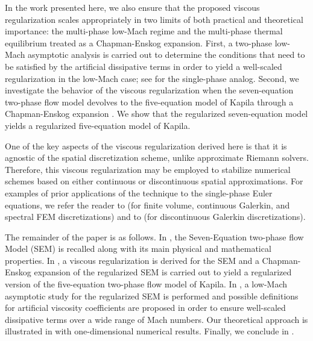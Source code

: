 In the work presented here, we also ensure that the proposed viscous regularization scales appropriately in two limits of both practical
and theoretical importance: the multi-phase low-Mach regime and the multi-phase thermal equilibrium treated as a Chapman-Enskog expansion.
First, a two-phase low-Mach asymptotic analysis is carried out to determine the conditions that need to be satisfied by the artificial dissipative 
terms in order to yield a well-scaled regularization in the low-Mach case; see \cite{Marco_paper_low_mach} for the single-phase analog. 
Second, we investigate the behavior of the viscous regularization when the seven-equation two-phase flow model devolves to the five-equation 
model of Kapila \cite{Kapila_2001} through a Chapman-Enskog expansion \cite{dellacherie,GuillardMurrone2003}. We show 
that the regularized seven-equation model yields a regularized five-equation model of Kapila.

One of the key aspects of the viscous regularization derived here is that it is agnostic of the spatial discretization scheme, unlike approximate 
Riemann solvers. Therefore, this viscous regularization may be employed to stabilize numerical schemes based on either continuous or discontinuous 
spatial approximations. For examples of prior applications of the technique to the single-phase Euler equations, we refer the reader to 
\cite{jlg_VR_SIAM_2004,Marco_paper_low_mach} (for finite volume, continuous Galerkin, and spectral FEM discretizations) and to \cite{valentin} 
(for discontinuous Galerkin discretizations). 

The remainder of the paper is as follows. In , the Seven-Equation two-phase flow Model (SEM) is recalled along with its main 
physical and mathematical properties. In , a viscous regularization is derived for the SEM and a Chapman-Enskog expansion of the 
regularized SEM is carried out to yield a regularized version of the five-equation two-phase flow model of Kapila. In , a low-Mach 
asymptotic study for the regularized SEM is performed and possible definitions for artificial viscosity coefficients are proposed in order to ensure 
well-scaled dissipative terms over a wide range of Mach numbers. Our theoretical approach is illustrated in  with one-dimensional 
numerical results. Finally, we conclude in .
%
